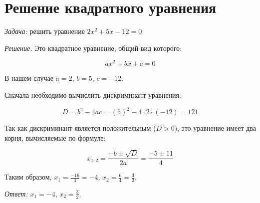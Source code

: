 \documentclass{article}
\begin{document}
\section{Решение квадратного уравнения}

\textit{Задача:} решить уравнение $2x^2+5x-12=0$

\textit{Решение.} Это квадратное уравнение, общий вид которого:

\[
ax^2+bx+c=0
\]

В нашем случае $a=2$, $b=5$, $c=-12$.

Сначала необходимо вычислить дискриминант уравнения:

\[
D=b^2-4ac=(5)^2-4\cdot2\cdot(-12)=121
\]

Так как дискриминант является положительным ($D>0$), это уравнение
имеет два корня, вычисляемые по формуле:


\[
x_{1,2}=\frac{-b\pm\sqrt{D}}{2a}=\frac{-5\pm11}{4}
\]


Таким образом, $x_{1}=\frac{-16}{4}=-4$, $x_{2}=\frac{6}{4}=\frac{3}{2}$.


\textit{Ответ:} $x_{1}=-4$, $x_{2}=\frac{3}{2}$.
\end{document}
